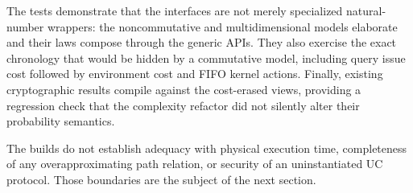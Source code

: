The tests demonstrate that the interfaces are not merely specialized natural-
number wrappers: the noncommutative and multidimensional models elaborate and
their laws compose through the generic APIs.  They also exercise the exact
chronology that would be hidden by a commutative model, including query issue
cost followed by environment cost and FIFO kernel actions.  Finally, existing
cryptographic results compile against the cost-erased views, providing a
regression check that the complexity refactor did not silently alter their
probability semantics.

The builds do not establish adequacy with physical execution time, completeness
of any overapproximating path relation, or security of an uninstantiated UC
protocol.  Those boundaries are the subject of the next section.
